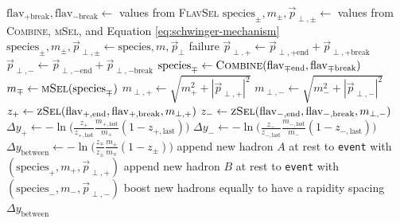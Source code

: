 \documentclass[12pt,a4paper]{report}
\begin{document}
\begin{algorithm}
  \caption{The algorithm used by the accordion model to create the final two hadrons.}
  \label{alg:accordion-final-two}
  \begin{algorithmic}
        \State $\text{flav}_{+\text{break}}, \text{flav}_{-\text{break}} \gets$ values from \textsc{FlavSel}
        \State $\text{species}_\pm, m_\pm, \vec{p}_{\perp,\pm} \gets$ values from \textsc{Combine}, \textsc{mSel}, and Equation \eqref{eq:schwinger-mechanism}
      \Else
        \State $\text{species}_\pm, m_\pm, \vec{p}_{\perp,\pm} \gets \text{species}, m, \vec{p}_\perp$
      \EndIf
        \State \Return failure
      \EndIf
      \State $\vec{p}_{\perp,+} \gets \vec{p}_{\perp,+\text{end}} + \vec{p}_{\perp,+\text{break}}$
      \State $\vec{p}_{\perp,-} \gets \vec{p}_{\perp,-\text{end}} + \vec{p}_{\perp,-\text{break}}$
      \Repeat
        \State $\text{species}_\mp \gets \textsc{Combine}(\text{flav}_{\mp\text{end}}, \text{flav}_{\mp\text{break}})$
        \State $m_\mp \gets \textsc{mSel}(\text{species}_\mp)$
      \State $m_{\perp,+} \gets \sqrt{m_+^2 + |\vec{p}_{\perp,+}|^2}$
      \State $m_{\perp,-} \gets \sqrt{m_-^2 + |\vec{p}_{\perp,-}|^2}$
      \State $z_+ \gets \textsc{zSel}(\text{flav}_{+,\text{end}}, \text{flav}_{+,\text{break}}, m_{\perp,+})$
      \State $z_- \gets \textsc{zSel}(\text{flav}_{-,\text{end}}, \text{flav}_{-,\text{break}}, m_{\perp,-})$
      \State $\Delta y_+ \gets -\ln\Bigr( \frac{z_+}{z_{+,\text{last}}} \frac{m_{+,\text{last}}}{m_+} (1 - z_{+,\text{last}}) \Bigr)$
      \State $\Delta y_- \gets -\ln\Bigr( \frac{z_-}{z_{-,\text{last}}} \frac{m_{-,\text{last}}}{m_-} (1 - z_{-,\text{last}}) \Bigr)$
      \State $\Delta y_\text{between} \gets -\ln\Bigr( \frac{z_\mp}{z_\pm} \frac{m_\pm}{m_\mp} (1 - z_\pm) \Bigr)$
      \State append new hadron $A$ at rest to \texttt{event} with $(\text{species}_+, m_+, \vec{p}_{\perp,+})$
      \State append new hadron $B$ at rest to \texttt{event} with $(\text{species}_-, m_-, \vec{p}_{\perp,-})$
      \State boost new hadrons equally to have a rapidity spacing $\Delta y_\text{between}$

\end{algorithmic}
\end{algorithm}
\end{document}

